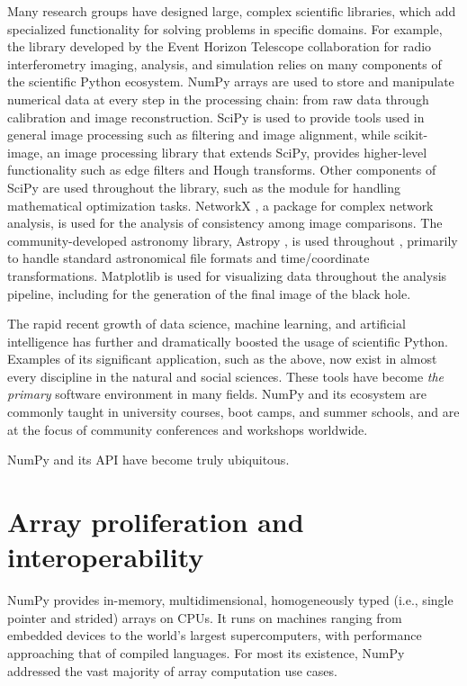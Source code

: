 Many research groups have designed large,
complex scientific libraries, which add specialized functionality for
solving problems in specific domains.
For example, the  library \cite{chael2019ehtim} developed by the Event Horizon Telescope 
collaboration for radio interferometry imaging, analysis, and simulation
relies on many components of the scientific Python ecosystem.
NumPy arrays are used to store and manipulate numerical data at every step
in the processing chain: from raw data through calibration and image
reconstruction.
SciPy is used to provide tools used in general image processing such as
filtering and image alignment, while scikit-image, an image processing
library that extends SciPy, provides higher-level functionality such as
edge filters and Hough transforms.
Other components of SciPy are used throughout the library, such as the
 module for handling mathematical optimization tasks.
NetworkX \cite{SciPyProceedings_11}, a package for complex
network analysis, is used for the analysis of consistency among image
comparisons.
The community-developed astronomy library, Astropy \cite{astropy:2013, astropy:2018},
is used throughout , primarily to handle standard
astronomical file formats and time/coordinate transformations.
Matplotlib is used for visualizing data throughout the analysis pipeline,
including for the generation of the final image of the black hole.

The rapid recent growth of data science, machine learning, and
artificial intelligence has further and dramatically boosted the usage of
scientific Python.  Examples of its significant application, such as the
above, now exist in almost every discipline in the natural and social
sciences.  These tools have become \emph{the primary}
software environment in many fields.  NumPy and its ecosystem are commonly
taught in university courses, boot camps, and summer schools, and are
at the focus of community conferences and workshops worldwide.

NumPy and its API have become truly ubiquitous.

\section*{Array proliferation and interoperability}

NumPy provides in-memory, multidimensional, homogeneously typed
(i.e., single pointer and strided) arrays on CPUs.  It runs on machines
ranging from embedded devices to the world's largest supercomputers,
with performance approaching that of compiled languages.  For
most its existence, NumPy addressed the vast majority of
array computation use cases.

